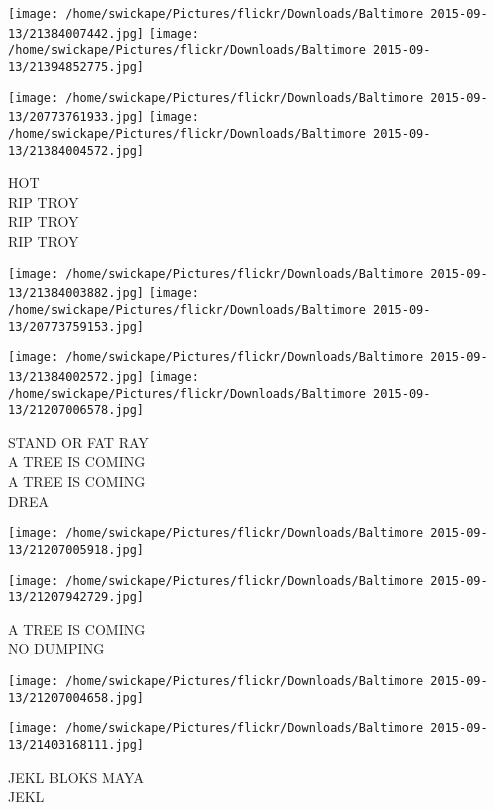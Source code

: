 \documentclass[10pt,letterpaper]{article}
\begin{document}
\texttt{[image: /home/swickape/Pictures/flickr/Downloads/Baltimore 2015-09-13/21384007442.jpg]}
\texttt{[image: /home/swickape/Pictures/flickr/Downloads/Baltimore 2015-09-13/21394852775.jpg]}

\texttt{[image: /home/swickape/Pictures/flickr/Downloads/Baltimore 2015-09-13/20773761933.jpg]}
\texttt{[image: /home/swickape/Pictures/flickr/Downloads/Baltimore 2015-09-13/21384004572.jpg]}

HOT\\
RIP TROY\\
RIP TROY\\
RIP TROY\\
\pagebreak

\texttt{[image: /home/swickape/Pictures/flickr/Downloads/Baltimore 2015-09-13/21384003882.jpg]}
\texttt{[image: /home/swickape/Pictures/flickr/Downloads/Baltimore 2015-09-13/20773759153.jpg]}

\texttt{[image: /home/swickape/Pictures/flickr/Downloads/Baltimore 2015-09-13/21384002572.jpg]}
\texttt{[image: /home/swickape/Pictures/flickr/Downloads/Baltimore 2015-09-13/21207006578.jpg]}

STAND OR FAT RAY\\
A TREE IS COMING\\
A TREE IS COMING\\
DREA\\
\pagebreak

\texttt{[image: /home/swickape/Pictures/flickr/Downloads/Baltimore 2015-09-13/21207005918.jpg]}

\vspace{0.25in}
\texttt{[image: /home/swickape/Pictures/flickr/Downloads/Baltimore 2015-09-13/21207942729.jpg]}

A TREE IS COMING\\
NO DUMPING\\
\pagebreak

\texttt{[image: /home/swickape/Pictures/flickr/Downloads/Baltimore 2015-09-13/21207004658.jpg]}

\vspace{0.25in}
\texttt{[image: /home/swickape/Pictures/flickr/Downloads/Baltimore 2015-09-13/21403168111.jpg]}

JEKL BLOKS MAYA\\
JEKL\\
\pagebreak
\end{document}
